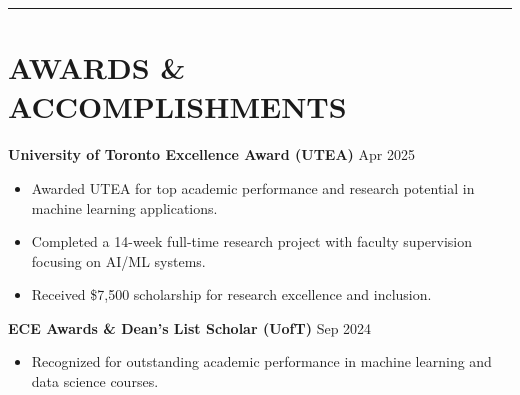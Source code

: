 \documentclass[letterpaper,10pt]{article}
\begin{document}
\noindent\rule{\linewidth}{1pt}

\section*{\textbf{AWARDS \& ACCOMPLISHMENTS}}

\noindent\textbf{University of Toronto Excellence Award (UTEA)} \hfill Apr 2025
\begin{itemize}[leftmargin=0.2in]
    \item Awarded UTEA for top academic performance and research potential in machine learning applications.
    \item Completed a 14-week full-time research project with faculty supervision focusing on AI/ML systems.
    \item Received \$7,500 scholarship for research excellence and inclusion.
\end{itemize}

\vspace{0.2cm}
\noindent\textbf{ECE Awards \& Dean's List Scholar (UofT)} \hfill Sep 2024
\begin{itemize}[leftmargin=0.2in]
    \item Recognized for outstanding academic performance in machine learning and data science courses.
\end{itemize}
\end{document}
